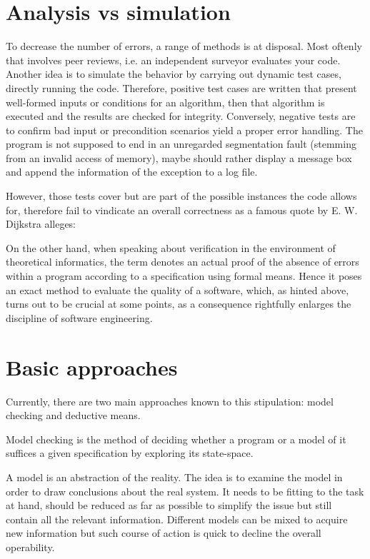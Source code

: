 \section{Analysis vs simulation}
To decrease the number of errors, a range of methods is at disposal. Most oftenly that involves peer reviews, i.e. an independent surveyor evaluates your code. Another idea is to simulate the behavior by carrying out dynamic test cases, directly running the code. Therefore, positive test cases are written that present well-formed inputs or conditions for an algorithm, then that algorithm is executed and the results are checked for integrity. Conversely, negative tests are to confirm bad input or precondition scenarios yield a proper error handling. The program is not supposed to end in an unregarded segmentation fault (stemming from an invalid access of memory), maybe should rather display a message box and append the information of the exception to a log file.

However, those tests cover but are part of the possible instances the code allows for, therefore fail to vindicate an overall correctness as a famous quote by E. W. Dijkstra alleges:


On the other hand, when speaking about verification in the environment of theoretical informatics, the term denotes an actual proof of the absence of errors within a program according to a specification using formal means. Hence it poses an exact method to evaluate the quality of a software, which, as hinted above, turns out to be crucial at some points, as a consequence rightfully enlarges the discipline of software engineering.

\section{Basic approaches}
Currently, there are two main approaches known to this stipulation: model checking and deductive means.

Model checking is the method of deciding whether a program or a model of it suffices a given specification by exploring its state-space.

A model is an abstraction of the reality. The idea is to examine the model in order to draw conclusions about the real system. It needs to be fitting to the task at hand, should be reduced as far as possible to simplify the issue but still contain all the relevant information. Different models can be mixed to acquire new information but such course of action is quick to decline the overall operability.

